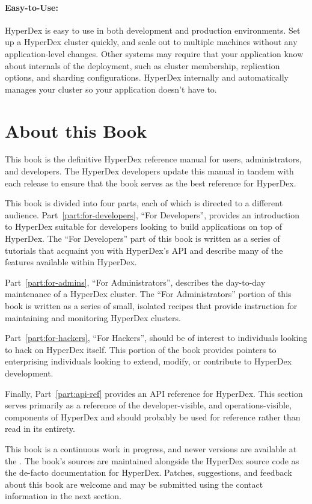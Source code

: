 \paragraph{Easy-to-Use:}  HyperDex is easy to use in both development and
production environments.  Set up a HyperDex cluster quickly, and scale out to
multiple machines without any application-level changes.  Other systems may
require that your application know about internals of the deployment, such as
cluster membership, replication options, and sharding configurations.  HyperDex
internally and automatically manages your cluster so your application doesn't
have to.

\section{About this Book}

This book is the definitive HyperDex reference manual for users, administrators,
and developers.  The HyperDex developers update this manual in tandem with each
release to ensure that the book serves as the best reference for HyperDex.

This book is divided into four parts, each of which is directed to a different
audience.  Part~\ref{part:for-developers}, ``For Developers'', provides an
introduction to HyperDex suitable for developers looking to build applications
on top of HyperDex.  The ``For Developers'' part of this book is written as a
series of tutorials that acquaint you with HyperDex's API and describe many of
the features available within HyperDex.

Part~\ref{part:for-admins}, ``For Administrators'', describes the day-to-day
maintenance of a HyperDex cluster.  The ``For Administrators'' portion of this
book is written as a series of small, isolated recipes that provide instruction
for maintaining and monitoring HyperDex clusters.

Part~\ref{part:for-hackers}, ``For Hackers'', should be of interest to
individuals looking to hack on HyperDex itself.  This portion of the book
provides pointers to enterprising individuals looking to extend, modify, or
contribute to HyperDex development.

Finally, Part~\ref{part:api-ref} provides an API reference for HyperDex.  This
section serves primarily as a reference of the developer-visible, and
operations-visible, components of HyperDex and should probably be used for
reference rather than read in its entirety.

This book is a continuous work in progress, and newer versions are available at
the .  The book's sources are
maintained alongside the HyperDex source code as the de-facto documentation for
HyperDex.  Patches, suggestions, and feedback about this book are welcome and
may be submitted using the contact information in the next section.

